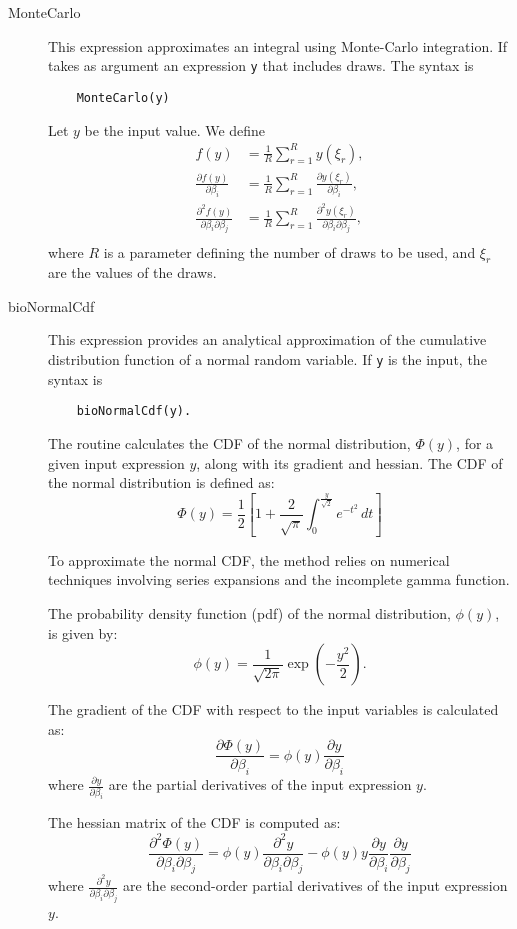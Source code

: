 \documentclass[12pt,a4paper]{article}
\begin{document}
\begin{description}
  
\item[MonteCarlo] This expression approximates an integral using Monte-Carlo integration.
If takes as argument an expression
  \lstinline+y+ that includes draws.
The syntax is
  \begin{lstlisting}
    MonteCarlo(y)
  \end{lstlisting}
  Let $y$ be the input value. We define
  \begin{align*}
    f(y) &= \frac{1}{R}\sum_{r=1}^R y(\xi_r), \\
    \frac{\partial f(y)}{\partial \beta_i} &= \frac{1}{R}\sum_{r=1}^R \frac{\partial y(\xi_r)}{\partial \beta_i}, \\
    \frac{\partial^2 f(y)}{\partial \beta_i\partial \beta_j} &= \frac{1}{R}\sum_{r=1}^R \frac{\partial^2 y(\xi_r)}{\partial \beta_i \partial \beta_j}, \\
  \end{align*}
  where $R$ is a parameter defining the number of draws to be used, and $\xi_r$ are the values of the draws.
  
\item[bioNormalCdf] This expression provides an analytical approximation of the cumulative distribution function of a normal random variable. If \lstinline+y+ is the input, the syntax is
  \begin{lstlisting}
    bioNormalCdf(y).
  \end{lstlisting}
The routine calculates the CDF of the normal distribution, $\Phi(y)$, for a given input expression $y$, along with its gradient and hessian. The CDF of the normal distribution is defined as:
\[
\Phi(y) = \frac{1}{2} \left[ 1 + \frac{2}{\sqrt{\pi}} \int_0^{\frac{y}{\sqrt{2}}} e^{-t^2} \, dt \right]
\]

To approximate the normal CDF, the method relies on numerical
techniques involving series expansions and the incomplete gamma
function.

The probability density function (pdf) of the normal distribution, $\phi(y)$, is given by:
\[
\phi(y) = \frac{1}{\sqrt{2\pi}} \exp\left( -\frac{y^2}{2} \right).
\]

The gradient of the CDF with respect to the input variables is calculated as:
\[
\frac{\partial \Phi(y)}{\partial \beta_i} = \phi(y) \frac{\partial y}{\partial \beta_i}
\]
where $\frac{\partial y}{\partial \beta_i}$ are the partial derivatives of the input expression $y$.

The hessian matrix of the CDF is computed as:
\[
\frac{\partial^2 \Phi(y)}{\partial \beta_i \partial \beta_j} = \phi(y) \frac{\partial^2 y}{\partial \beta_i \partial \beta_j} - \phi(y) y \frac{\partial y}{\partial \beta_i} \frac{\partial y}{\partial \beta_j}
\]
where $\frac{\partial^2 y}{\partial \beta_i \partial \beta_j}$ are the second-order partial derivatives of the input expression $y$.



\end{description}
\end{document}
